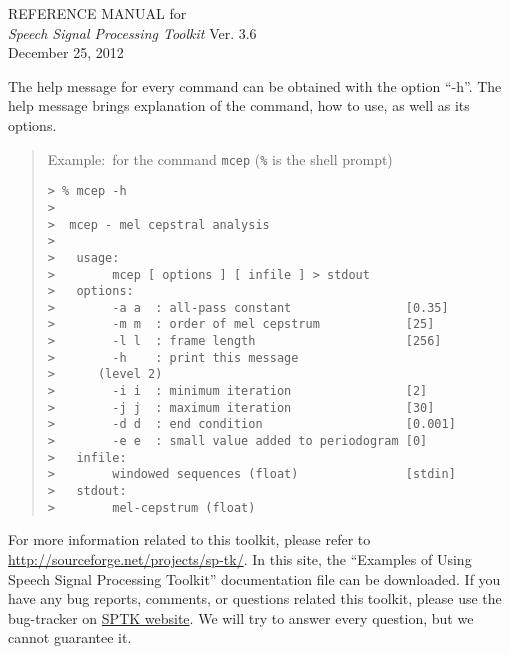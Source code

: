 \documentclass[12pt]{book}
\begin{document}


\begin{titlepage} 
\vspace*{\fill}
 \begin{center}
        \LARGE
        {\rm REFERENCE MANUAL for} \\
        {\sl Speech Signal Processing Toolkit} Ver. 3.6 \\[10mm]
        {\rm December 25, 2012}
 \end{center}
\vspace*{\fill}
\vspace*{\fill}

\newpage
\thispagestyle{empty}
\vspace*{\fill}
\noindent
The help message for every command can be obtained
with the option ``-h''.
The help message brings explanation of the command, how to use, 
as well as its options.

\begin{quote}
 Example:~for the command \verb!mcep! (\verb!%! is the shell prompt)
 \begin{verbatim}
> % mcep -h
> 
>  mcep - mel cepstral analysis
> 
>   usage:
>        mcep [ options ] [ infile ] > stdout
>   options:
>        -a a  : all-pass constant                [0.35]
>        -m m  : order of mel cepstrum            [25]
>        -l l  : frame length                     [256]
>        -h    : print this message
>      (level 2)
>        -i i  : minimum iteration                [2]
>        -j j  : maximum iteration                [30]
>        -d d  : end condition                    [0.001]
>        -e e  : small value added to periodogram [0]
>   infile:
>        windowed sequences (float)               [stdin]
>   stdout:
>        mel-cepstrum (float)
 \end{verbatim}
\end{quote}
\vspace{\baselineskip}
\noindent
For more information related to this toolkit,
please refer to
\href{http://sourceforge.net/projects/sp-tk/}{http://sourceforge.net/projects/sp-tk/}.
In this site, the
``Examples of Using Speech Signal Processing Toolkit''
documentation file can be downloaded.
If you have any bug reports, comments, or questions
related this toolkit, please use the bug-tracker on
\href{http://sourceforge.net/tracker/?group_id=176586}{SPTK website}.
We will try to answer every question, but we cannot guarantee it.
\end{titlepage}
\end{document}

